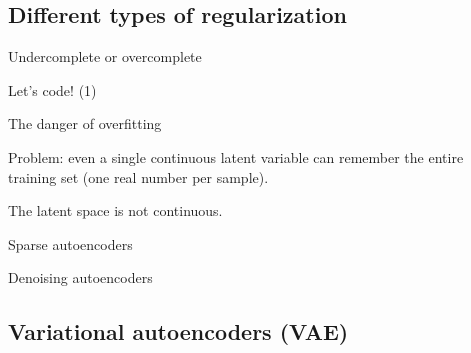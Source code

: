 \documentclass{beamer}
\begin{document}
  \subsection{Different types of regularization}

  \begin{frame}{Undercomplete or overcomplete}
    
  \end{frame}

  \begin{frame}{Let's code! (1)}


    
  \end{frame}

  \begin{frame}{The danger of overfitting}
    
    Problem: even a single continuous latent variable can remember the entire training set (one real number per sample).

    The latent space is not continuous.

  \end{frame}

  \begin{frame}{Sparse autoencoders}
    
  \end{frame}

  \begin{frame}{Denoising autoencoders}

    \cite{Vincent2010}
    
  \end{frame}

  \subsection{Variational autoencoders (VAE)}
\end{document}
